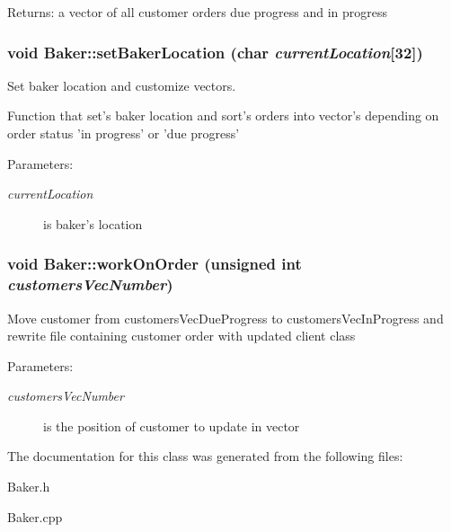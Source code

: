 \begin{Desc}
\item[Returns:]a vector of all customer orders due progress and in progress \end{Desc}
\hypertarget{class_baker_b85151ecb20282d81b4dab489fea7dd8}{
\subsubsection[setBakerLocation]{\setlength{\rightskip}{0pt plus 5cm}void Baker::set\-Baker\-Location (char {\em current\-Location}\mbox{[}32\mbox{]})}}
\label{class_baker_b85151ecb20282d81b4dab489fea7dd8}


Set baker location and customize vectors. 

Function that set's baker location and sort's orders into vector's depending on order status 'in progress' or 'due progress'

\begin{Desc}
\item[Parameters:]
\begin{description}
\item[{\em current\-Location}]is baker's location \end{description}
\end{Desc}
\hypertarget{class_baker_9616413c80f3814907a9c2399ac50438}{
\subsubsection[workOnOrder]{\setlength{\rightskip}{0pt plus 5cm}void Baker::work\-On\-Order (unsigned int {\em customers\-Vec\-Number})}}
\label{class_baker_9616413c80f3814907a9c2399ac50438}


Move customer from customers\-Vec\-Due\-Progress to customers\-Vec\-In\-Progress and rewrite file containing customer order with updated client class

\begin{Desc}
\item[Parameters:]
\begin{description}
\item[{\em customers\-Vec\-Number}]is the position of customer to update in vector \end{description}
\end{Desc}


The documentation for this class was generated from the following files:\begin{CompactItemize}
\item 
Baker.h\item 
Baker.cpp\end{CompactItemize}
